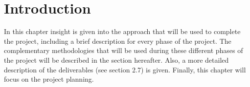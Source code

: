 \section{Introduction}
In this chapter insight is given into the approach that will be used to complete the project, including a brief description for every phase of the project. The complementary methodologies that will be used during these different phases of the project will be described in the section hereafter. Also, a more detailed description of the deliverables (see section 2.7) is given. Finally, this chapter will focus on the project planning.

